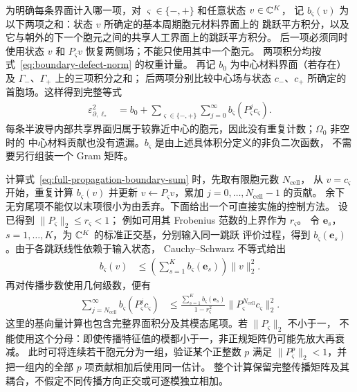 为明确每条界面计入哪一项，对 $\varsigma\in\{-,+\}$ 和任意状态 $v\in\mathbb{C}^K$，
记 $b_\varsigma(v)$ 为以下两项之和：状态 $v$ 所确定的基本周期胞元材料界面上的
跳跃平方积分，以及它与朝外的下一个胞元之间的共享人工界面上的跳跃平方积分。
后一项必须同时使用状态 $v$ 和 $P_\varsigma v$ 恢复两侧场；不能只使用其中一个胞元。
两项积分均按式~\eqref{eq:boundary-defect-norm} 的权重计量。
再记 $b_0$ 为中心材料界面（若存在）及 $\Gamma_-$、$\Gamma_+$ 上的三项积分之和；
后两项分别比较中心场与状态 $c_-$、$c_+$ 所确定的首胞场。这样得到完整等式
\begin{align}
  \varepsilon_{\partial,\ell_*}^2
  &=b_0+\sum_{\varsigma\in\{-,+\}}\sum_{j=0}^{\infty}
    b_\varsigma(P_\varsigma^jc_\varsigma).
  \label{eq:full-propagation-boundary-sum}
\end{align}
每条半波导内部共享界面归属于较靠近中心的胞元，因此没有重复计数；$\Omega_0$ 非空时的
中心材料贡献也没有遗漏。$b_\varsigma$ 是由上述具体积分定义的非负二次函数，
不需要另行组装一个 Gram 矩阵。

计算式~\eqref{eq:full-propagation-boundary-sum} 时，先取有限胞元数 $N_{\mathrm{cell}}$，
从 $v=c_\varsigma$ 开始，重复计算 $b_\varsigma(v)$ 并更新
$v\leftarrow P_\varsigma v$，累加 $j=0,\ldots,N_{\mathrm{cell}}-1$ 的贡献。
余下无穷尾项不能仅以末项很小为由丢弃。下面给出一个可直接实施的控制方法。
设已得到 $\|P_\varsigma\|_2\leq r_\varsigma<1$；
例如可用其 Frobenius 范数的上界作为 $r_\varsigma$。
令 $\boldsymbol e_s$，$s=1,\ldots,K$，为 $\mathbb{C}^K$ 的标准正交基，分别输入同一跳跃
评价过程，得到 $b_\varsigma(\boldsymbol e_s)$。由于各跳跃线性依赖于输入状态，
Cauchy--Schwarz 不等式给出
\begin{align*}
  b_\varsigma(v)
  &\leq\left(\sum_{s=1}^K b_\varsigma(\boldsymbol e_s)\right)\|v\|_2^2.
\end{align*}
再对传播步数使用几何级数，便有
\begin{align}
  \sum_{j=N_{\mathrm{cell}}}^{\infty}
    b_\varsigma(P_\varsigma^jc_\varsigma)
  &\leq
  \frac{\displaystyle\sum_{s=1}^K b_\varsigma(\boldsymbol e_s)}
       {1-r_\varsigma^2}
  \bigl\|P_\varsigma^{N_{\mathrm{cell}}}c_\varsigma\bigr\|_2^2.
  \label{eq:boundary-propagation-tail}
\end{align}
这里的基向量计算也包含完整界面积分及其模态尾项。若 $\|P_\varsigma\|_2$ 不小于一，
不能使用这个分母：即使传播特征值的模都小于一，非正规矩阵仍可能先放大再衰减。
此时可将连续若干胞元分为一组，验证某个正整数 $p$ 满足
$\|P_\varsigma^p\|_2<1$，并把一组内的全部 $p$ 项贡献相加后使用同一估计。
整个计算保留完整传播矩阵及其耦合，不假定不同传播方向正交或可逐模独立相加。

